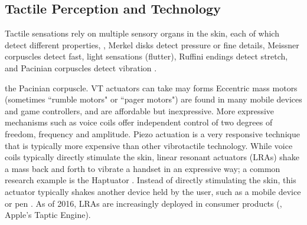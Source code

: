 \subsection{Tactile Perception and Technology}
Tactile sensations rely on multiple sensory organs in the skin, each of which detect different properties, \eg, Merkel disks detect pressure or fine details, Meissner corpuscles detect fast, light sensations (flutter), Ruffini endings detect stretch, and Pacinian corpuscles detect vibration \cite{ChoiKuchenbecker2013}.

 the Pacinian corpuscle.
VT actuators can take may forms
Eccentric mass motors (sometimes ``rumble motors" or ``pager motors") are found in many mobile devices and game controllers, and are affordable but inexpressive.
More expressive mechanisms such as voice coils %
offer independent control of two degrees of freedom, frequency and amplitude.
Piezo actuation is a very responsive technique that is typically more expensive than other vibrotactile technology.
While voice coils typically directly stimulate the skin, linear resonant actuators (LRAs) shake a mass back and forth to vibrate a handset in an expressive way; a common research example is the Haptuator \cite{Yao2010}.
Instead of directly stimulating the skin, this actuator typically shakes another device held by the user, such as a mobile device \cite{Yoo2014} or pen \cite{Culbertson2014}.
As of 2016, LRAs are increasingly deployed in consumer products (\eg, Apple's Taptic Engine).

